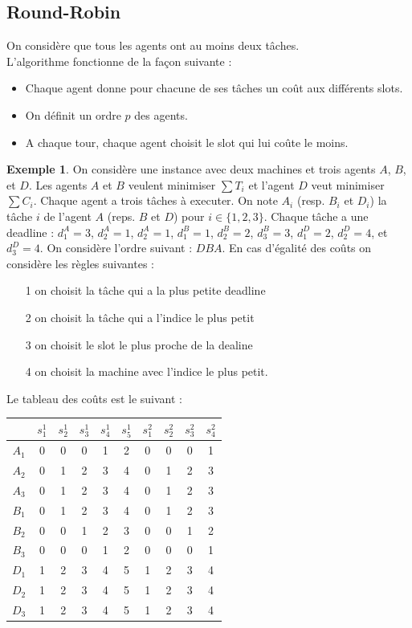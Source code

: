 \documentclass[12pt]{article}
\theoremstyle{definition}
\newtheorem{exemple}{Exemple}
\begin{document}
\subsection{Round-Robin}
\noindent
On considère que tous les agents ont au moins deux tâches.\\
L'algorithme fonctionne de la façon suivante :
\begin{itemize}
	\item Chaque agent donne pour chacune de ses tâches un coût aux différents slots.
	\item On définit un ordre $p$ des agents.
	\item A chaque tour, chaque agent choisit le slot qui lui coûte le moins.
\end{itemize}

\begin{exemple}
On considère une instance avec deux machines et trois agents $A$, $B$, et $D$. Les agents $A$ et $B$ veulent minimiser $\sum T_i$ et l'agent $D$ veut minimiser $\sum C_i$. Chaque agent a trois tâches à executer. On note $A_i$ (resp. $B_i$ et $D_i$) la tâche $i$ de l'agent $A$ (reps. $B$ et $D$) pour $i\in \{1, 2, 3\}$. Chaque tâche a une deadline : $d_1^A = 3$, $d_2^A = 1$, $d_2^A = 1$, $d_1^B = 1$, $d_2^B = 2$, $d_3^B = 3$, $d_1^D = 2$, $d_2^D = 4$, et $d_3^D = 4$. On considère l'ordre suivant : $DBA$. En cas d'égalité des coûts on considère les règles suivantes : 
\begin{itemize}
\item[1] on choisit la tâche qui a la plus petite deadline
\item[2] on choisit la tâche qui a l'indice le plus petit
\item[3] on choisit le slot le plus proche de la dealine
\item[4] on choisit la machine avec l'indice le plus petit.
\end{itemize}
Le tableau des coûts est le suivant :

\begin{table}[H]
    \begin{tabular}{|c||c|c|c|c|c||c|c|c|c|}
        \hline
        & $s_1^1$ & $s_2^1$ & $s_3^1$ & $s_4^1$ & $s_5^1$ & $s_1^2$ & $s_2^2$ & $s_3^2$ & $s_4^2$ \\
        \hline 
        $A_1$ & 0 & 0 & 0 & 1 & 2 & 0 & 0 & 0 & 1 \\
        $A_2$ & 0 & 1 & 2 & 3 & 4 & 0 & 1 & 2 & 3 \\
        $A_3$ & 0 & 1 & 2 & 3 & 4 & 0 & 1 & 2 & 3 \\
        \hline
        $B_1$ & 0 & 1 & 2 & 3 & 4 & 0 & 1 & 2 & 3 \\
        $B_2$ & 0 & 0 & 1 & 2 & 3 & 0 & 0 & 1 & 2 \\
        $B_3$ & 0 & 0 & 0 & 1 & 2 & 0 & 0 & 0 & 1 \\
        \hline
        $D_1$ & 1 & 2 & 3 & 4 & 5 & 1 & 2 & 3 & 4 \\
        $D_2$ & 1 & 2 & 3 & 4 & 5 & 1 & 2 & 3 & 4 \\
        $D_3$ & 1 & 2 & 3 & 4 & 5 & 1 & 2 & 3 & 4 \\
        \hline
    \end{tabular}
\end{table}


\end{exemple}
\end{document}
